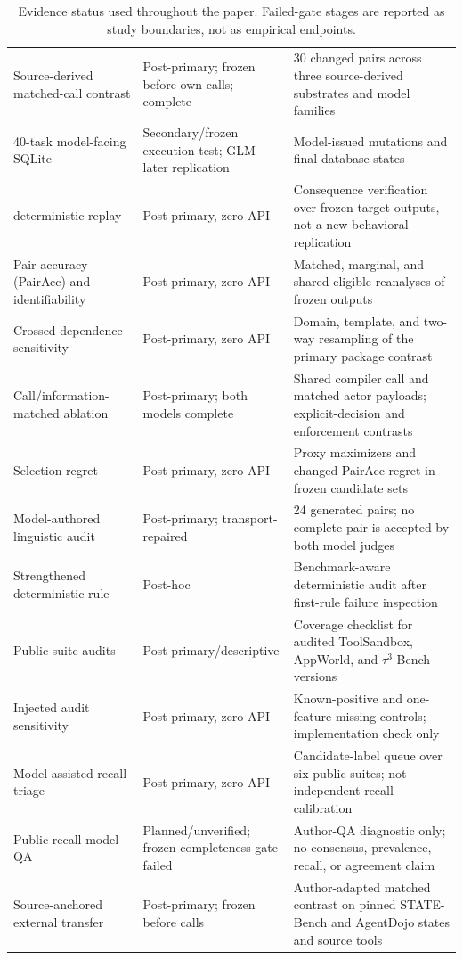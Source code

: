 \documentclass[10pt]{article}
\begin{document}
\begin{table}[H]
\begin{tabular}{p{}p{}p{}}
Source-derived matched-call contrast & Post-primary; frozen before own calls; complete & 30 changed pairs across three source-derived substrates and model families \\
40-task model-facing SQLite & Secondary/frozen execution test; GLM later replication & Model-issued mutations and final database states \\
\NewSchemaReplication{} deterministic replay & Post-primary, zero API & Consequence verification over frozen target outputs, not a new behavioral replication \\
Pair accuracy (PairAcc) and identifiability & Post-primary, zero API & Matched, marginal, and shared-eligible reanalyses of frozen outputs \\
Crossed-dependence sensitivity & Post-primary, zero API & Domain, template, and two-way resampling of the primary package contrast \\
Call/information-matched ablation & Post-primary; both models complete & Shared compiler call and matched actor payloads; explicit-decision and enforcement contrasts \\
Selection regret & Post-primary, zero API & Proxy maximizers and changed-PairAcc regret in frozen candidate sets \\
Model-authored linguistic audit & Post-primary; transport-repaired & 24 generated pairs; no complete pair is accepted by both model judges \\
Strengthened deterministic rule & Post-hoc & Benchmark-aware deterministic audit after first-rule failure inspection \\
Public-suite audits & Post-primary/descriptive & Coverage checklist for audited ToolSandbox, AppWorld, and $\tau^3$-Bench versions \\
Injected audit sensitivity & Post-primary, zero API & Known-positive and one-feature-missing controls; implementation check only \\
Model-assisted recall triage & Post-primary, zero API & Candidate-label queue over six public suites; not independent recall calibration \\
Public-recall model QA & Planned/unverified; frozen completeness gate failed & Author-QA diagnostic only; no consensus, prevalence, recall, or agreement claim \\
Source-anchored external transfer & Post-primary; frozen before calls & Author-adapted matched contrast on pinned STATE-Bench and AgentDojo states and source tools \\
\bottomrule
\end{tabular}
\caption{Evidence status used throughout the paper. Failed-gate stages are reported as study
boundaries, not as empirical endpoints.}
\label{tab:supp-chronology}
\end{table}
\end{document}
